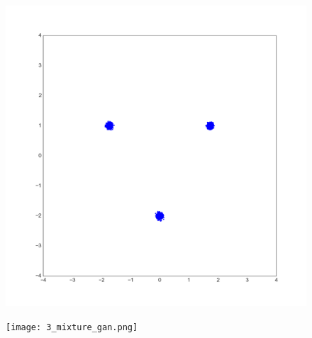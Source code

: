 \documentclass[dvipdfmx,12pt,unicode]{beamer}
\begin{document}
\begin{frame}
  \begin{figure}[htb]
    \begin{center}
      \includegraphics[width=\linewidth]{3_mixture_true.png}
    \end{center}
  \end{figure}
\end{frame}

\begin{frame}
  \begin{figure}[htb]
    \begin{center}
      \texttt{[image: 3\_mixture\_gan.png]}
    \end{center}
  \end{figure}
\end{frame}
\end{document}
